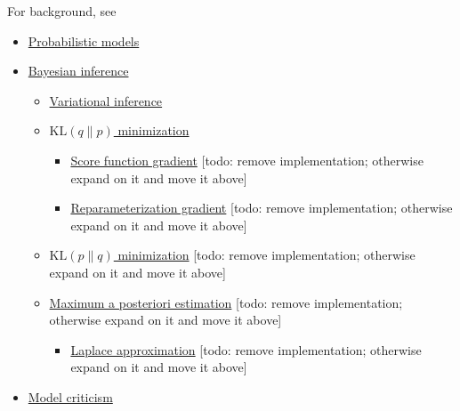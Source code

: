 For background, see
\begin{itemize}
  \item \href{model}{Probabilistic models}
  \item \href{inference}{Bayesian inference}
  \begin{itemize}
   \item \href{variational-inference}{Variational inference}
   \item \href{klqp}{$\text{KL}(q\|p)$ minimization}
   \begin{itemize}
     \item \href{klqp-score}{Score function gradient} [todo: remove implementation; otherwise expand on it and move it above]
     \item \href{klqp-reparam}{Reparameterization gradient} [todo: remove implementation; otherwise expand on it and move it above]
   \end{itemize}
   \item \href{klpq}{$\text{KL}(p\|q)$ minimization} [todo: remove implementation; otherwise expand on it and move it above]
   \item \href{map}{Maximum a posteriori estimation} [todo: remove implementation; otherwise expand on it and move it above]
   \begin{itemize}
     \item \href{map-laplace}{Laplace approximation} [todo: remove implementation; otherwise expand on it and move it above]
   \end{itemize}
  \end{itemize}
  \item \href{criticism}{Model criticism}
\end{itemize}

